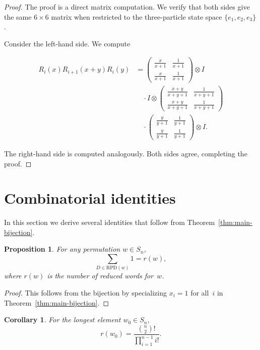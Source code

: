 \documentclass{amsart}
\theoremstyle{plain}
\newtheorem{proposition}[theorem]{Proposition}
\newtheorem{corollary}[theorem]{Corollary}
\theoremstyle{definition}
\theoremstyle{remark}
\begin{document}
\begin{proof}
The proof is a direct matrix computation. We verify that both sides
give the same $6 \times 6$ matrix when restricted to the three-particle
state space $\{e_1, e_2, e_3\}$.

Consider the left-hand side.  We compute

\begin{align*}
R_i(x) R_{i+1}(x+y) R_i(y)
  &= \begin{pmatrix} \frac{x}{x+1} & \frac{1}{x+1} \\ \frac{x}{x+1} & \frac{1}{x+1} \end{pmatrix}
     \otimes I \\
  &\quad \cdot I \otimes \begin{pmatrix} \frac{x+y}{x+y+1} & \frac{1}{x+y+1} \\ \frac{x+y}{x+y+1} & \frac{1}{x+y+1} \end{pmatrix}
     \\
  &\quad \cdot \begin{pmatrix} \frac{y}{y+1} & \frac{1}{y+1} \\ \frac{y}{y+1} & \frac{1}{y+1} \end{pmatrix}
     \otimes I.
\end{align*}

The right-hand side is computed analogously.  Both sides agree, completing   
the proof.
\end{proof}

\section{Combinatorial identities}
\label{sec:identities}

In this section we derive several identities that follow from
Theorem~\ref{thm:main-bijection}.
\begin{proposition}
\label{prop:sum-identity}
For any permutation $w \in S_n$,
\[
\sum_{D \in \mathrm{RPD}(w)} 1 = r(w),
\]
where $r(w)$ is the number of reduced words for~$w$.
\end{proposition}

\begin{proof}
This follows from the bijection by specializing $x_i = 1$ for all~$i$
in Theorem~\ref{thm:main-bijection}.
\end{proof}

\begin{corollary}
\label{cor:longest-element}
For the longest element $w_0 \in S_n$,
\[
r(w_0) = \frac{\binom{n}{2}!}{\prod_{i=1}^{n-1} i!}.
\]
\end{corollary}
\end{document}
